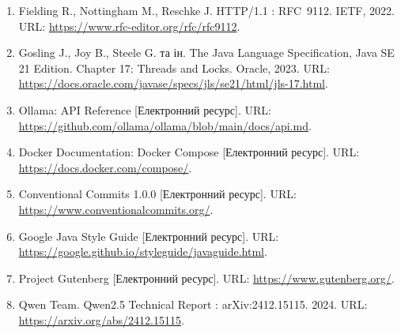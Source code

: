 \begin{enumerate}[label=\arabic*.,leftmargin=*,labelindent=\parindent,itemsep=1pt]
\url{https://www.rfc-editor.org/rfc/rfc6455}.
\item Fielding R., Nottingham M., Reschke J. HTTP/1.1 : RFC~9112. IETF, 2022. URL:
\url{https://www.rfc-editor.org/rfc/rfc9112}.
\item Gosling J., Joy B., Steele G. та ін. The Java Language Specification, Java SE 21
Edition. Chapter 17: Threads and Locks. Oracle, 2023. URL:
\url{https://docs.oracle.com/javase/specs/jls/se21/html/jls-17.html}.
\item Ollama: API Reference [Електронний ресурс]. URL:
\url{https://github.com/ollama/ollama/blob/main/docs/api.md}.
\item Docker Documentation: Docker Compose [Електронний ресурс]. URL:
\url{https://docs.docker.com/compose/}.
\item Conventional Commits 1.0.0 [Електронний ресурс]. URL:
\url{https://www.conventionalcommits.org/}.
\item Google Java Style Guide [Електронний ресурс]. URL:
\url{https://google.github.io/styleguide/javaguide.html}.
\item Project Gutenberg [Електронний ресурс]. URL: \url{https://www.gutenberg.org/}.
\item Qwen Team. Qwen2.5 Technical Report : arXiv:2412.15115. 2024. URL:
\url{https://arxiv.org/abs/2412.15115}.
\end{enumerate}
